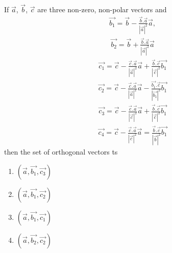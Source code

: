 \item If $\overrightarrow{a}$, $\overrightarrow{b}$, $\overrightarrow{c}$ are three non-zero, non-polar vectors and 
\begin{align*}
\overrightarrow{b_1} = \overrightarrow{b} - \frac{\overrightarrow{b}.\overrightarrow{a}}{|\overrightarrow{a}|^{2}}\overrightarrow{a},
\end{align*}
\begin{align*}
\overrightarrow{b_2} = \overrightarrow{b} + \frac{\overrightarrow{b}.\overrightarrow{a}}{|\overrightarrow{a}|^{2}}\overrightarrow{a} 
\end{align*}
\begin{align*}
\overrightarrow{c_1} = \overrightarrow{c} - \frac{\overrightarrow{c}.\overrightarrow{a}}{|\overrightarrow{a}|^{2}}\overrightarrow{a} + \frac{\overrightarrow{b}.\overrightarrow{c}}{|\overrightarrow{c}|^{2}}\overrightarrow{b_1}
\end{align*}
\begin{align*}
\overrightarrow{c_2} = \overrightarrow{c} - \frac{\overrightarrow{c}.\overrightarrow{a}}{|\overrightarrow{a}|^{2}}\overrightarrow{a} - \frac{\overrightarrow{b_1}.\overrightarrow{c}}{|\overrightarrow{b_1}|^{2}}\overrightarrow{b_1}
\end{align*}
\begin{align*}
\overrightarrow{c_3} = \overrightarrow{c} - \frac{\overrightarrow{c}.\overrightarrow{a}}{|\overrightarrow{c}|^{2}}\overrightarrow{a} + \frac{\overrightarrow{b}.\overrightarrow{c}}{|\overrightarrow{c}|^{2}}\overrightarrow{b_1}
\end{align*}
\begin{align*}
\overrightarrow{c_4} = \overrightarrow{c} - \frac{\overrightarrow{c}.\overrightarrow{a}}{|\overrightarrow{c}|^{2}}\overrightarrow{a} = \frac{\overrightarrow{b}.\overrightarrow{c}}{|\overrightarrow{b}|^{2}}\overrightarrow{b_1}
\end{align*}
then the set of orthogonal vectors ts
\begin{enumerate}
\item $(\overrightarrow{a}, \overrightarrow{b_1}, \overrightarrow{c_3})$
\item $(\overrightarrow{a}, \overrightarrow{b_1}, \overrightarrow{c_2})$
\item $(\overrightarrow{a}, \overrightarrow{b_1}, \overrightarrow{c_1})$
\item $(\overrightarrow{a}, \overrightarrow{b_2}, \overrightarrow{c_2})$
\end{enumerate}

